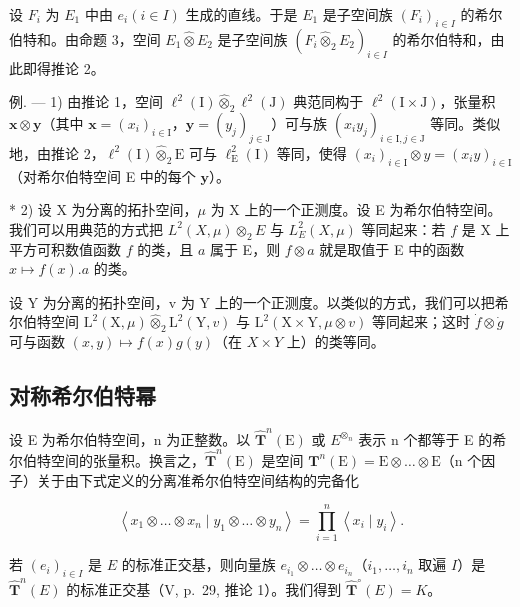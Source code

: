 设 \(F_{i}\) 为 \(E_{1}\) 中由 \(e_{i} (i \in I)\) 生成的直线。于是 \(E_{1}\) 是子空间族 \((F_{i})_{i \in I}\) 的希尔伯特和。由命题 3，空间 \(E_{1} \hat{\otimes} E_{2}\) 是子空间族 \((F_{i} \hat{\otimes}_{2} E_{2})_{i \in I}\) 的希尔伯特和，由此即得推论 2。

例. --- 1) 由推论 1，空间 \(\ell^2 (\mathrm{I})\hat{\otimes}_2\ell^2 (\mathrm{J})\) 典范同构于 \(\ell^2 (\mathrm{I}\times \mathrm{J})\)，张量积 \(\mathbf{x}\otimes \mathbf{y}\)（其中 \(\mathbf{x} = (x_i)_{i\in \mathrm{I}}\)，\(\mathbf{y} = (y_j)_{j\in \mathrm{J}}\)）可与族 \((x_iy_j)_{i\in \mathrm{I},j\in \mathrm{J}}\) 等同。类似地，由推论 2，\(\ell^2 (\mathrm{I})\hat{\otimes}_2\mathrm{E}\) 可与 \(\ell_{\mathrm{E}}^{2}(\mathrm{I})\) 等同，使得 \((x_{i})_{i\in \mathrm{I}}\otimes y = (x_{i}y)_{i\in \mathrm{I}}\)（对希尔伯特空间 E 中的每个 \(\mathbf{y}\)）。

* 2) 设 X 为分离的拓扑空间，\(\mu\) 为 X 上的一个正测度。设 E 为希尔伯特空间。我们可以用典范的方式把 \(L^2(X, \mu) \otimes_2 E\) 与 \(L_E^2(X, \mu)\) 等同起来：若 \(f\) 是 X 上平方可积数值函数 \(f\) 的类，且 \(a\) 属于 E，则 \(f \otimes a\) 就是取值于 E 中的函数 \(x \mapsto f(x).a\) 的类。

设 Y 为分离的拓扑空间，v 为 Y 上的一个正测度。以类似的方式，我们可以把希尔伯特空间 \(\mathrm{L}^{2}(\mathrm{X},\mu)\hat{\otimes}_{2}\mathrm{L}^{2}(\mathrm{Y},v)\) 与 \(\mathrm{L}^{2}(\mathrm{X}\times\mathrm{Y},\mu\otimes v)\) 等同起来；这时 \(\dot{f}\otimes\dot{g}\) 可与函数 \((x,y)\mapsto f(x)g(y)\)（在 \(X\times Y\) 上）的类等同。

\subsection{对称希尔伯特幂}

设 E 为希尔伯特空间，n 为正整数。以 \(\hat{\mathbf{T}}^{n}(\mathrm{E})\) 或 \(E^{\otimes_{n}}\) 表示 n 个都等于 E 的希尔伯特空间的张量积。换言之，\(\hat{\mathbf{T}}^{n}(\mathrm{E})\) 是空间 \(\mathbf{T}^{n}(\mathrm{E}) = \mathrm{E} \otimes \ldots \otimes \mathrm{E}\)（n 个因子）关于由下式定义的分离准希尔伯特空间结构的完备化

\[
\left\langle x _ {1} \otimes \dots \otimes x _ {n} \mid y _ {1} \otimes \dots \otimes y _ {n} \right\rangle = \prod_ {i = 1} ^ {n} \left\langle x _ {i} \mid y _ {i} \right\rangle .
\]

若 \((e_i)_{i\in I}\) 是 \(E\) 的标准正交基，则向量族 \(e_{i_1} \otimes \ldots \otimes e_{i_n}\)（\(i_1, \ldots, i_n\) 取遍 \(I\)）是 \(\hat{\mathbf{T}}^n(E)\) 的标准正交基（V, p.~29, 推论 1）。我们得到 \(\hat{\mathbf{T}}^\circ(E) = K\)。

